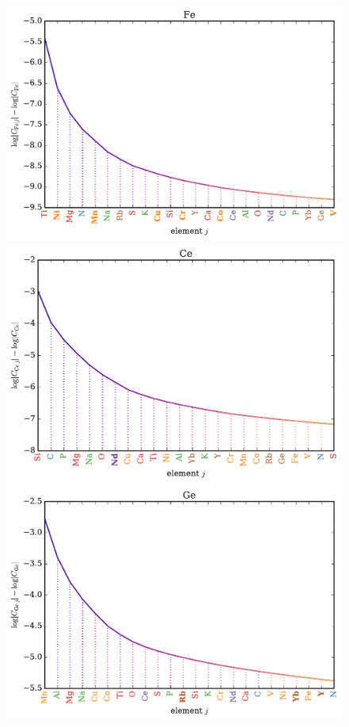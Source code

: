 \documentclass[a4paper,fleqn,usenatbib]{mnras}
\begin{document}
\begin{figure}
	\includegraphics[width=\columnwidth]{apogee_centers_final_29502_spc_win_wid_1p5_fe_inf_gain.pdf}
	\includegraphics[width=\columnwidth]{apogee_centers_final_29502_spc_win_wid_1p5_ce_inf_gain.pdf}
	\includegraphics[width=\columnwidth]{apogee_centers_final_29502_spc_win_wid_1p5_ge_inf_gain.pdf}

\end{figure}
\end{document}
